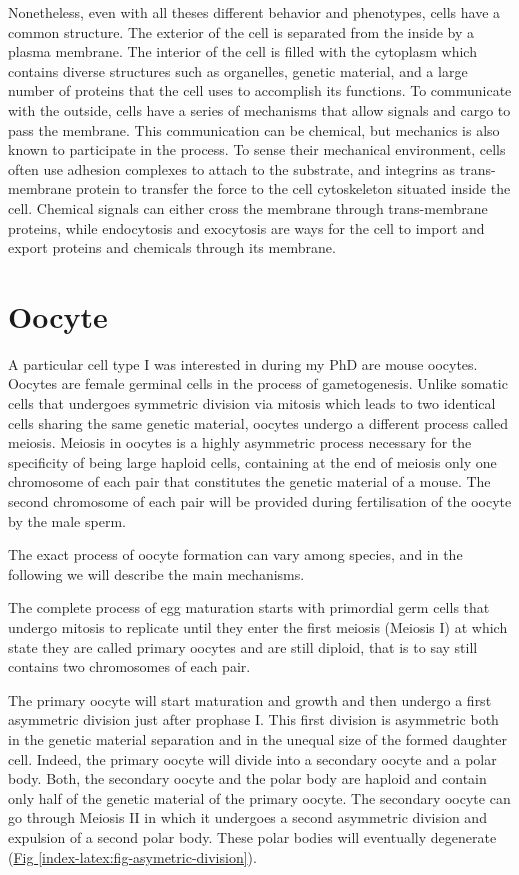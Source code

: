 \documentclass[A4paperpaper,11pt,english]{sphinxmanual}
\begin{document}
Nonetheless, even with all theses different behavior and phenotypes, cells
have a common structure. The exterior of the cell is separated from the
inside by a plasma membrane. The interior of the cell is filled with the cytoplasm
which contains diverse structures such as organelles, genetic material, and
a large number of proteins that the cell uses to accomplish its functions. To
communicate with the outside, cells have a series of mechanisms that allow signals
and cargo to pass the membrane. This communication can be chemical, but
mechanics is also known to participate in the process. To sense their
mechanical environment, cells often use adhesion complexes to attach to the
substrate, and integrins as trans-membrane protein to transfer the force to the
cell cytoskeleton situated inside the cell. Chemical signals can either cross
the membrane through trans-membrane proteins, while endocytosis and exocytosis are
ways for the cell to import and export proteins and chemicals through its membrane.


\section{Oocyte}
\label{index-latex:oocyte}
A particular cell type I was interested in during my PhD are mouse oocytes.
Oocytes are female germinal cells in the process of gametogenesis. Unlike
somatic cells that undergoes symmetric division via mitosis which leads to
two identical cells sharing the same genetic material, oocytes undergo a
different process called meiosis.  Meiosis in oocytes is a highly asymmetric
process necessary for the specificity of being large haploid
cells, containing at the end of meiosis only one chromosome of each pair
that constitutes the genetic material of a mouse. The second chromosome of each pair
will be provided during fertilisation of the oocyte by the male sperm.

The exact process of oocyte formation can vary among species, and in the following we will
describe the main mechanisms.

The complete process of egg maturation starts with primordial germ cells that
undergo mitosis to replicate until they enter the first meiosis (Meiosis I)
at which state they are called primary oocytes and are still diploid, that is to say still contains two chromosomes of each pair.

The primary oocyte will start maturation and growth and then undergo a first
asymmetric division just after prophase I.  This first division is asymmetric
both in the genetic material separation and in the unequal size of the formed
daughter cell. Indeed, the primary oocyte will divide into a secondary oocyte
and a polar body. Both, the secondary oocyte and the polar body are haploid and contain
only half of the genetic material of the primary oocyte.  The secondary oocyte
can go through Meiosis II in which it undergoes a second asymmetric division
and expulsion of a second polar body. These polar bodies will eventually degenerate
(\hyperref[index-latex:fig-asymetric-division]{Fig  \ref*{index-latex:fig-asymetric-division}}).
\end{document}
